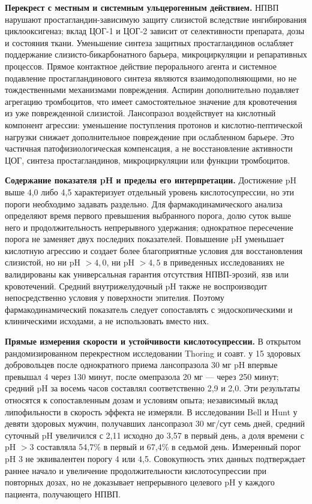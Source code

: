 \documentclass[11pt,a4paper,notitlepage]{report}
\newcommand{\src}[1]{\unskip\space\cite{#1}}
\begin{document}
\textbf{Перекрест с местным и системным ульцерогенным действием.} НПВП нарушают простагландин-зависимую защиту слизистой вследствие ингибирования циклооксигеназ; вклад ЦОГ-1 и ЦОГ-2 зависит от селективности препарата, дозы и состояния ткани. Уменьшение синтеза защитных простагландинов ослабляет поддержание слизисто-бикарбонатного барьера, микроциркуляции и репаративных процессов. Прямое контактное действие перорального агента и системное подавление простагландинового синтеза являются взаимодополняющими, но не тождественными механизмами повреждения. Аспирин дополнительно подавляет агрегацию тромбоцитов, что имеет самостоятельное значение для кровотечения из уже поврежденной слизистой. Лансопразол воздействует на кислотный компонент агрессии: уменьшение поступления протонов и кислотно-пептической нагрузки снижает дополнительное повреждение при ослабленном барьере. Это частичная патофизиологическая компенсация, а не восстановление активности ЦОГ, синтеза простагландинов, микроциркуляции или функции тромбоцитов.\src{fdcnaprapac,fdctakeldalabel,misotrial}

\textbf{Содержание показателя pH и пределы его интерпретации.} Достижение pH выше 4,0 либо 4,5 характеризует отдельный уровень кислотосупрессии, но эти пороги необходимо задавать раздельно. Для фармакодинамического анализа определяют время первого превышения выбранного порога, долю суток выше него и продолжительность непрерывного удержания; однократное пересечение порога не заменяет двух последних показателей. Повышение pH уменьшает кислотную агрессию и создает более благоприятные условия для восстановления слизистой, но ни pH $>4{,}0$, ни pH $>4{,}5$ в приведенных исследованиях не валидированы как универсальная гарантия отсутствия НПВП-эрозий, язв или кровотечений. Средний внутрижелудочный pH также не воспроизводит непосредственно условия у поверхности эпителия. Поэтому фармакодинамический показатель следует сопоставлять с эндоскопическими и клиническими исходами, а не использовать вместо них.\src{phthoring1999,phbell1996,misotrial,aspirin15}

\textbf{Прямые измерения скорости и устойчивости кислотосупрессии.} В открытом рандомизированном перекрестном исследовании Thoring и соавт. у 15 здоровых добровольцев после однократного приема лансопразола 30 мг pH впервые превышал 4 через 130 минут, после омепразола 20 мг --- через 250 минут; средний pH за восемь часов составлял соответственно 2,9 и 2,0. Эти результаты относятся к сопоставленным дозам и условиям опыта; независимый вклад липофильности в скорость эффекта не измеряли.\src{phthoring1999} В исследовании Bell и Hunt у девяти здоровых мужчин, получавших лансопразол 30 мг/сут семь дней, средний суточный pH увеличился с 2,11 исходно до 3,57 в первый день, а доля времени с pH $>3$ составляла 54,7\% в первый и 67,4\% в седьмой день. Измеренный порог pH 3 не эквивалентен порогу 4 или 4,5. Совокупность этих данных подтверждает раннее начало и увеличение продолжительности кислотосупрессии при повторных дозах, но не доказывает непрерывного целевого pH у каждого пациента, получающего НПВП.\src{phbell1996}
\end{document}
